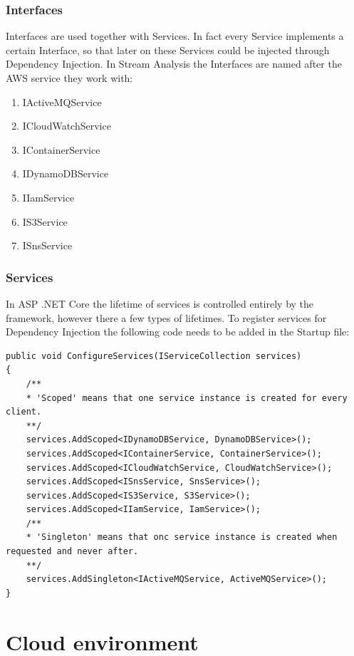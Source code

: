 \subsubsection{Interfaces}
\label{chap:04:02:03:05}

Interfaces are used together with Services. In fact every Service implements a certain Interface, so that later on these Services could be injected through Dependency Injection. In Stream Analysis the Interfaces are named after the AWS service they work with:
\begin{enumerate}
	\item IActiveMQService
	\item ICloudWatchService
	\item IContainerService
	\item IDynamoDBService
	\item IIamService
	\item IS3Service
	\item ISnsService
\end{enumerate}

\subsubsection{Services}
\label{chap:04:02:03:05}

In ASP .NET Core the lifetime of services is controlled entirely by the framework, however there a few types of lifetimes. To register services for Dependency Injection the following code needs to be added in the Startup file:

\begin{lstlisting}
public void ConfigureServices(IServiceCollection services)
{
	/**
	* 'Scoped' means that one service instance is created for every client.
	**/
	services.AddScoped<IDynamoDBService, DynamoDBService>();
	services.AddScoped<IContainerService, ContainerService>();
	services.AddScoped<ICloudWatchService, CloudWatchService>();
	services.AddScoped<ISnsService, SnsService>();
	services.AddScoped<IS3Service, S3Service>();
	services.AddScoped<IIamService, IamService>();
	/**
	* 'Singleton' means that onc service instance is created when requested and never after.
	**/
	services.AddSingleton<IActiveMQService, ActiveMQService>();
}
\end{lstlisting}

\section{Cloud environment}
\label{chap:04:03}

